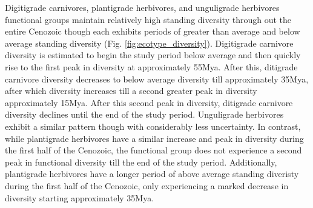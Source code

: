 \documentclass[12pt,letterpaper]{article}
\begin{document}
Digitigrade carnivores, plantigrade herbivores, and unguligrade herbivores functional groups maintain relatively high standing diversity through out the entire Cenozoic though each exhibits periods of greater than average and below average standing diversity (Fig. \ref{fig:ecotype_diversity}). Digitigrade carnivore diversity is estimated to begin the study period below average and then quickly rise to the first peak in diversity at approximately 55Mya. After this, ditigrade carnivore diversity decreases to below average diversity till approximately 35Mya, after which diversity increases till a second greater peak in diversity approximately 15Mya. After this second peak in diversity, ditigrade carnivore diversity declines until the end of the study period. Unguligrade herbivores exhibit a similar pattern though with considerably less uncertainty. In contrast, while plantigrade herbivores have a similar increase and peak in diversity during the first half of the Cenozoic, the functional group does not experience a second peak in functional diversity till the end of the study period. Additionally, plantigrade herbivores have a longer period of above average standing diveristy during the first half of the Cenozoic, only experiencing a marked decrease in diversity starting approximately 35Mya.
\end{document}
